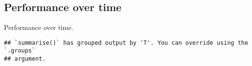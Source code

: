 \documentclass[]{book}
\newenvironment{Shaded}{\begin{snugshade}}{\end{snugshade}}
\newcommand{\DataTypeTok}[1]{\textcolor[rgb]{0.13,0.29,0.53}{#1}}
\newcommand{\KeywordTok}[1]{\textcolor[rgb]{0.13,0.29,0.53}{\textbf{#1}}}
\newcommand{\NormalTok}[1]{#1}
\newcommand{\OperatorTok}[1]{\textcolor[rgb]{0.81,0.36,0.00}{\textbf{#1}}}
\newcommand{\StringTok}[1]{\textcolor[rgb]{0.31,0.60,0.02}{#1}}
\begin{document}
\hypertarget{performance-over-time-2}{%
\subsection{Performance over time}\label{performance-over-time-2}}

Performance over time.

\begin{Shaded}
\end{Shaded}

\begin{verbatim}
## `summarise()` has grouped output by 'T'. You can override using the `.groups`
## argument.
\end{verbatim}
\end{document}
